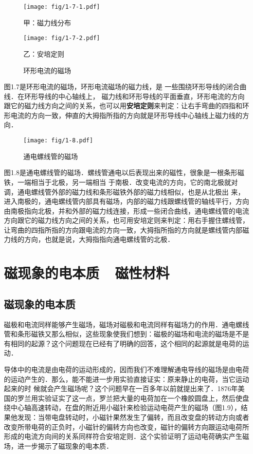 \begin{figure}[htp]
\centering
\begin{minipage}[t]{0.48\textwidth}
\centering
\texttt{[image: fig/1-7-1.pdf]}
\caption*{甲：磁力线分布}
\end{minipage}
\begin{minipage}[t]{0.48\textwidth}
\centering
\texttt{[image: fig/1-7-2.pdf]}
\caption*{乙：安培定则}
\end{minipage}
\caption{环形电流的磁场}
\end{figure}

图1.7是环形电流的磁场，环形电流磁场的磁力线，是
一些围绕环形导线的闭合曲线．在环形导线的中心轴线上，
磁力线和环形导线的平面垂直，环形电流的方向跟它的磁力线方向之间的关系，也可以用\textbf{安培定则}来判定：让右手弯曲的四指和环形电流的方向一致，伸直的大拇指所指的方向就是环形导线中心轴线上磁力线的方向．

\begin{figure}[htp]\centering
\texttt{[image: fig/1-8.pdf]}
\caption{通电螺线管的磁场}
\end{figure}

图1.8是通电螺线管的磁场．螺线管通电以后表现出来的磁性，很象是一根条形磁铁，一端相当于北极，另一端相当
于南极．改变电流的方向，它的南北极就对调，通电螺线管外部的磁力线和条形磁铁外部的磁力线相似，也是从北极出
来，进入南极的，通电螺线管内部具有磁场，内部的磁力线跟螺线管的轴线平行，方向由南极指向北极，并和外部的磁力线连接，形成一些闭合曲线，通电螺线管的电流方向跟它的磁力线方向之间的关系，也可用安培定则来判定：用右手握住螺线管，让弯曲的四指所指的方向跟电流的方向一致，大拇指所指的方向就是螺线管内部磁力线的方向，也就是说，大拇指指向通电螺线管的北极．

\section{磁现象的电本质~~磁性材料}
\subsection{磁现象的电本质}


磁极和电流同样能够产生磁场，磁场对磁极和电流同样有磁场力的作用．通电螺线管和条形磁铁又那么相似，这些现象使我们想到：磁极的磁场和电流的磁场是不是有相同的起源？这个问题现在已经有了明确的回答，这个相同的起源就是电荷的运动．

导体中的电流是由电荷的运动形成的，因而我们不难理解通电导线的磁场是由电荷的运动产生的．那么，能不能进一步用实验直接证实：原来静止的电荷，当它运动起来的时
候就会产生磁场呢？这个问题早在一百多年以前就提出来了．1876年美国的罗兰用实验证实了这一点，罗兰把大量的电荷加在一个橡胶圆盘上，然后使盘绕中心轴高速转动，在盘的附近用小磁针来检验运动电荷产生的磁场（图1.9），结果他发现：当带电盘转动时，小磁针果然发生了偏转，而且改变盘的转动方向或者改变所带电荷的正负时，小磁针的偏转方向也改变，磁针的偏转方向跟运动电荷所形成的电流方向间的关系同样符合安培定则．这个实验证明了运动电荷确实产生磁场，进一步揭示了磁现象的电本质．

